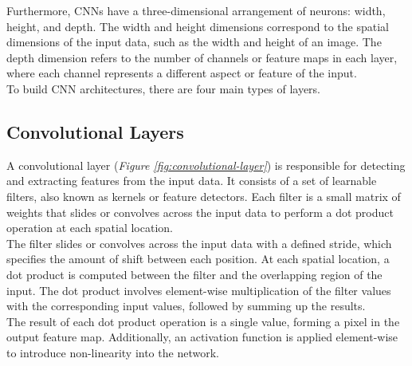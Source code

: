 Furthermore, CNNs have a three-dimensional arrangement of neurons: width, height, and depth. The width and height dimensions correspond to the spatial dimensions of the input data, such as the width and height of an image. The depth dimension refers to the number of channels or feature maps in each layer, where each channel represents a different aspect or feature of the input. \\

To build CNN architectures, there are four main types of layers.

\subsection{Convolutional Layers}

A convolutional layer (\textit{Figure \ref{fig:convolutional-layer}}) is responsible for detecting and extracting features from the input data. It consists of a set of learnable filters, also known as kernels or feature detectors. Each filter is a small matrix of weights that slides or convolves across the input data to perform a dot product operation at each spatial location.  \\

The filter slides or convolves across the input data with a defined stride, which specifies the amount of shift between each position.
At each spatial location, a dot product is computed between the filter and the overlapping region of the input.
The dot product involves element-wise multiplication of the filter values with the corresponding input values, followed by summing up the results. \\

The result of each dot product operation is a single value, forming a pixel in the output feature map. Additionally, an activation function is applied element-wise to introduce non-linearity into the network. \\

\newpage


